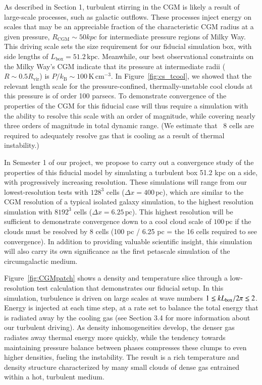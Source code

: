 \documentclass[11pt,letterpaper,english]{article}
\begin{document}
As described in Section 1, turbulent stirring in the CGM is likely a result of large-scale processes, such as galactic outflows. These processes inject energy on scales that may be an appreciable fraction of the characteristic CGM radius at a given pressure, $R_\mathrm{CGM} \sim 50 kpc$ for intermediate pressure regions of Milky Way. This driving scale sets the size requirement for our fiducial simulation box, with side lengths of $L_\mathrm{box} = 51.2\,\mathrm{kpc}$. Meanwhile, our best observational constraints on the Milky Way's CGM indicate that its pressure at intermediate radii ($R \sim 0.5 R_\mathrm{vir}$) is $P/k_\mathrm{B} \sim 100\,\mathrm{K}\,\mathrm{cm}^{-3}$. In Figure~\ref{fig:cs_tcool}, we showed that the relevant length scale for the pressure-confined, thermally-unstable cool clouds at this pressure is of order 100 parsecs. To demonstrate convergence of the properties of the CGM for this fiducial case will thus require a simulation with the ability to resolve this scale with an order of magnitude, while covering nearly three orders of magnitude in total dynamic range. (We estimate that ~8 cells are required to adequately resolve gas that is cooling as a result of thermal instability.) %

In Semester 1 of our project, we propose to carry out a convergence study of the properties of this fiducial model by simulating a turbulent box 51.2 kpc on a side, with progressively increasing resolution. These simulations will range from our lowest-resolution tests with $128^3$ cells ($\Delta x = 400\,\mathrm{pc}$), which are similar to the CGM resolution of a typical isolated galaxy simulation, to the highest resolution simulation with $8192^3$ cells ($\Delta x = 6.25\,\mathrm{pc}$). This highest resolution will be sufficient to demonstrate convergence down to a cool cloud scale of $100\,\mathrm{pc}$ if the clouds must be resolved by 8 cells (100 pc / 6.25 pc = the 16 cells required to see convergence). In addition to providing valuable scientific insight, this simulation will also carry its own significance as the first petascale simulation of the circumgalactic medium.

Figure~\ref{fig:CGMpatch} shows a density and temperature slice through a low-resolution test calculation that demonstrates our fiducial setup. In this simulation, turbulence is driven on large scales at wave numbers $1 \leq k L_{\rm box}/ 2 \pi \leq 2$. Energy is injected at each time step, at a rate set to balance the total energy that is radiated away by the cooling gas (see Section 3.4 for more information about our turbulent driving). As density inhomogeneities develop, the denser gas radiates away thermal energy more quickly, while the tendency towards maintaining pressure balance between phases compresses these clumps to even higher densities, fueling the instability. The result is a rich temperature and density structure characterized by many small clouds of dense gas entrained within a hot, turbulent medium.
\end{document}
